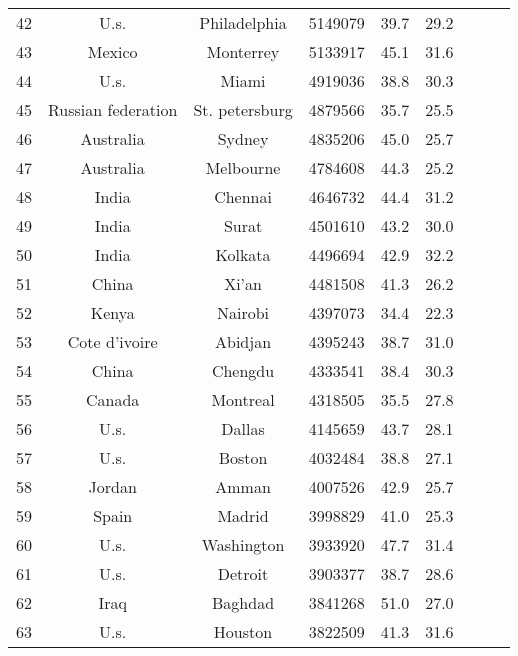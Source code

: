 \begin{table}
\begin{tabular}{ccccccccc}
  42 &                U.s. &    Philadelphia &    5149079 &     39.7 &     29.2 \\
  43 &              Mexico &       Monterrey &    5133917 &     45.1 &     31.6 \\
  44 &                U.s. &           Miami &    4919036 &     38.8 &     30.3 \\
  45 &  Russian federation &  St. petersburg &    4879566 &     35.7 &     25.5 \\
  46 &           Australia &          Sydney &    4835206 &     45.0 &     25.7 \\
  47 &           Australia &       Melbourne &    4784608 &     44.3 &     25.2 \\
  48 &               India &         Chennai &    4646732 &     44.4 &     31.2 \\
  49 &               India &           Surat &    4501610 &     43.2 &     30.0 \\
  50 &               India &         Kolkata &    4496694 &     42.9 &     32.2 \\
  51 &               China &           Xi'an &    4481508 &     41.3 &     26.2 \\
  52 &               Kenya &         Nairobi &    4397073 &     34.4 &     22.3 \\
  53 &       Cote d'ivoire &         Abidjan &    4395243 &     38.7 &     31.0 \\
  54 &               China &         Chengdu &    4333541 &     38.4 &     30.3 \\
  55 &              Canada &        Montreal &    4318505 &     35.5 &     27.8 \\
  56 &                U.s. &          Dallas &    4145659 &     43.7 &     28.1 \\
  57 &                U.s. &          Boston &    4032484 &     38.8 &     27.1 \\
  58 &              Jordan &           Amman &    4007526 &     42.9 &     25.7 \\
  59 &               Spain &          Madrid &    3998829 &     41.0 &     25.3 \\
  60 &                U.s. &      Washington &    3933920 &     47.7 &     31.4 \\
  61 &                U.s. &         Detroit &    3903377 &     38.7 &     28.6 \\
  62 &                Iraq &         Baghdad &    3841268 &     51.0 &     27.0 \\
  63 &                U.s. &         Houston &    3822509 &     41.3 &     31.6 \\

\end{tabular}
\end{table}
